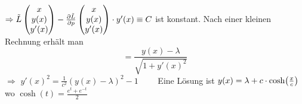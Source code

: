 \(
	\Rightarrow \tilde L \begin{pmatrix}
		x \\ y(x) \\ y'(x)
	\end{pmatrix} - \frac{{\partial \tilde L}}{{\partial p}}  \begin{pmatrix}
		x \\ y(x) \\ y'(x)
	\end{pmatrix} \cdot y'(x) \equiv C
\) ist konstant. Nach einer kleinen Rechnung erhält man 
\[
	= \frac{y(x) - \lambda }{\sqrt{1+ y'(x)^2}  } 
\]
$\Rightarrow $ $\boxed{y'(x)^2 = \frac{1}{c^2} (y(x) - \lambda )^2 -1} \qquad $ Eine Lösung ist $y(x) = \lambda + c \cdot \cosh \enbrace*{\frac{x}{c} } $ wo
$\cosh(t) = \frac{e^t + e^{-t}}{2} $

\cleardoubleoddemptypage
{}
\setcounter{page}{1}
\printindex
\listoffigures

